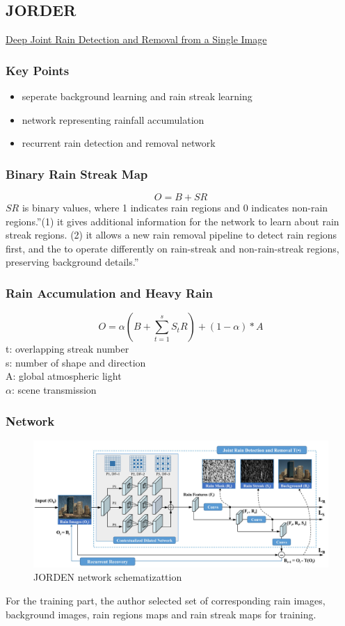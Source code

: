 \documentclass{article}
\begin{document}
\subsection{JORDER}
\href{http://www.icst.pku.edu.cn/struct/Projects/joint_rain_removal.html}{Deep Joint Rain Detection and Removal from a Single Image}
\subsubsection{Key Points}
\begin{itemize}
\item seperate background learning and rain streak learning
\item network representing rainfall accumulation
\item recurrent rain detection and removal network
\end{itemize}
\subsubsection{Binary Rain Streak Map}
\begin{equation}
O=B+SR
\end{equation}
$SR$ is binary values, where 1 indicates rain regions and 0 indicates non-rain regions.''(1) it gives additional information for the network to learn about rain streak regions. (2) it allows a new rain removal pipeline to detect rain regions first, and the to operate differently on rain-streak and non-rain-streak regions, preserving background details.''
\subsubsection{Rain Accumulation and Heavy Rain}
\begin{equation}
O=\alpha(B+\sum_{t=1}^{s}{S_t}R)+(1-\alpha)*A
\end{equation}
t: overlapping streak number\\
s: number of shape and direction\\
A: global atmospheric light\\
$\alpha$: scene transmission\\
\subsubsection{Network}
\begin{figure}[H]
\centering
\includegraphics[width=\linewidth]{JORDEN}
\caption{JORDEN network schematizattion}
\end{figure}
For the training part, the author selected set of corresponding rain images, background images, rain regions maps and rain streak maps for training.
\end{document}
